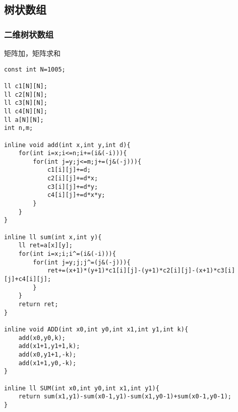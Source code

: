 \documentclass{ctexart}
\begin{document}
\subsection{树状数组}
\subsubsection{二维树状数组}
矩阵加，矩阵求和
\begin{lstlisting}
const int N=1005;

ll c1[N][N];
ll c2[N][N];
ll c3[N][N];
ll c4[N][N];
ll a[N][N];
int n,m;

inline void add(int x,int y,int d){
    for(int i=x;i<=n;i+=(i&(-i))){
        for(int j=y;j<=m;j+=(j&(-j))){
            c1[i][j]+=d;
            c2[i][j]+=d*x;
            c3[i][j]+=d*y;
            c4[i][j]+=d*x*y;
        }
    }
}

inline ll sum(int x,int y){
    ll ret=a[x][y];
    for(int i=x;i;i^=(i&(-i))){
        for(int j=y;j;j^=(j&(-j))){
            ret+=(x+1)*(y+1)*c1[i][j]-(y+1)*c2[i][j]-(x+1)*c3[i][j]+c4[i][j];
        }
    }
    return ret;
}

inline void ADD(int x0,int y0,int x1,int y1,int k){
    add(x0,y0,k);
    add(x1+1,y1+1,k);
    add(x0,y1+1,-k);
    add(x1+1,y0,-k);
}

inline ll SUM(int x0,int y0,int x1,int y1){
    return sum(x1,y1)-sum(x0-1,y1)-sum(x1,y0-1)+sum(x0-1,y0-1);
}
\end{lstlisting}
\end{document}

